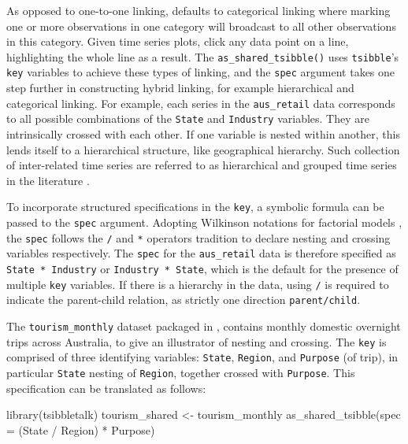 As opposed to one-to-one linking,  defaults to
categorical linking where marking one or more observations in one
category will broadcast to all other observations in this category.
Given time series plots, click any data point on a line, highlighting
the whole line as a result. The \texttt{as\_shared\_tsibble()} uses
\texttt{tsibble}'s \texttt{key} variables to achieve these types of
linking, and the \texttt{spec} argument takes one step further in
constructing hybrid linking, for example hierarchical and categorical
linking. For example, each series in the \texttt{aus\_retail} data
corresponds to all possible combinations of the \texttt{State} and
\texttt{Industry} variables. They are intrinsically crossed with each
other. If one variable is nested within another, this lends itself to a
hierarchical structure, like geographical hierarchy. Such collection of
inter-related time series are referred to as hierarchical and grouped
time series in the literature \citep{fpp}.

To incorporate structured specifications in the \texttt{key}, a symbolic
formula can be passed to the \texttt{spec} argument. Adopting Wilkinson
notations for factorial models \citep{Wilkinson1973}, the \texttt{spec}
follows the \texttt{/} and \texttt{*} operators tradition to declare
nesting and crossing variables respectively. The \texttt{spec} for the
\texttt{aus\_retail} data is therefore specified as
\texttt{State\ *\ Industry} or \texttt{Industry\ *\ State}, which is the
default for the presence of multiple \texttt{key} variables. If there is
a hierarchy in the data, using \texttt{/} is required to indicate the
parent-child relation, as strictly one direction \texttt{parent/child}.

The \texttt{tourism\_monthly} dataset \citep{tourism} packaged in
, contains monthly domestic overnight trips across
Australia, to give an illustrator of nesting and crossing. The
\texttt{key} is comprised of three identifying variables:
\texttt{State}, \texttt{Region}, and \texttt{Purpose} (of trip), in
particular \texttt{State} nesting of \texttt{Region}, together crossed
with \texttt{Purpose}. This specification can be translated as follows:

\begin{Schunk}
\begin{Sinput}
library(tsibbletalk)
tourism_shared <- tourism_monthly %
  as_shared_tsibble(spec = (State / Region) * Purpose)
\end{Sinput}
\end{Schunk}

